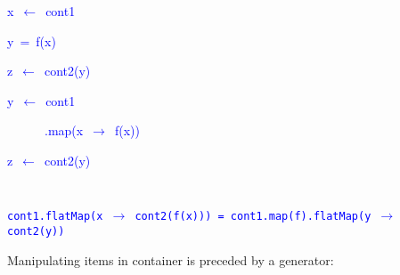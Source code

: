 \texttt{\textcolor{blue}{\footnotesize{}}}%
\begin{minipage}[c][1\totalheight][t]{0.49\columnwidth}%
\begin{lyxcode}
\textcolor{blue}{\footnotesize{}x~$\leftarrow$~cont1}{\footnotesize\par}

\textcolor{blue}{\footnotesize{}y~=~f(x)}{\footnotesize\par}

\textcolor{blue}{\footnotesize{}z~$\leftarrow$~cont2(y)}{\footnotesize\par}
\end{lyxcode}
%
\end{minipage}\texttt{\textcolor{blue}{\footnotesize{}\hfill{}}}%
\begin{minipage}[c][1\totalheight][t]{0.4\columnwidth}%
\begin{lyxcode}
\textcolor{blue}{\footnotesize{}y~$\leftarrow$~cont1}{\footnotesize\par}

\textcolor{blue}{\footnotesize{}~~~~~~.map(x~$\rightarrow$~f(x))}{\footnotesize\par}

\textcolor{blue}{\footnotesize{}z~$\leftarrow$~cont2(y)}{\footnotesize\par}
\end{lyxcode}
%
\end{minipage}\texttt{\textcolor{blue}{\footnotesize{}\hfill{}\medskip{}
}}{\footnotesize\par}

\texttt{\textcolor{blue}{\footnotesize{}cont1.flatMap(x $\rightarrow$
cont2(f(x))) = cont1.map(f).flatMap(y $\rightarrow$ cont2(y))}} 

Manipulating items in container is preceded by a generator:

